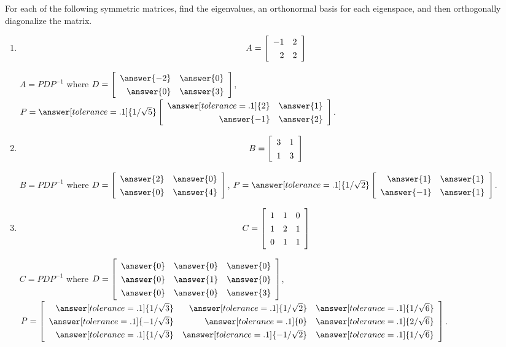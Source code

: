 \documentclass{ximera}
\begin{document}
\begin{problem}
  For each of the following symmetric matrices, find the eigenvalues,
  an orthonormal basis for each eigenspace, and then orthogonally
  diagonalize the matrix.
  \begin{enumerate}
    \item $$A = \startmat{rr}
      -1 & 2 \\
      2  & 2 \\
    \stopmat$$

    $A=PDP^{-1}$ where $D=\startmat{rr}
        \answer{-2} & \answer{0} \\
        \answer{0}  & \answer{3} \\
      \stopmat$,
      $P=\answer[tolerance=.1]{1/\sqrt{5}}\startmat{rr}
        \answer[tolerance=.1]{2}  & \answer{1} \\
        \answer{-1} & \answer{2} \\
      \stopmat$.



    \item $$B = \startmat{rr}
      3 & 1 \\
      1 & 3 \\
    \stopmat$$

      $B=PDP^{-1}$ where $D=\startmat{rr}
      \answer{2} & \answer{0} \\
      \answer{0} & \answer{4} \\
    \stopmat$,
    $P=\answer[tolerance=.1]{1/\sqrt{2}}\startmat{rr}
      \answer{1}  & \answer{1} \\
      \answer{-1} & \answer{1} \\
    \stopmat$.


    
    \item $$C= \startmat{rrr}
      1 & 1 & 0 \\
      1 & 2 & 1 \\
      0 & 1 & 1 \\
    \stopmat$$

    $C=PDP^{-1}$ where
      $D=\startmat{rrr}
        \answer{0} & \answer{0} & \answer{0} \\
        \answer{0} & \answer{1} & \answer{0} \\
        \answer{0} & \answer{0} & \answer{3} \\
      \stopmat$,
      $\def\arraystretch{1.3}
      P=\startmat{rrr}
        \answer[tolerance=.1]{1/\sqrt{3}} & \answer[tolerance=.1]{1/\sqrt{2}} & \answer[tolerance=.1]{1/\sqrt{6}} \\
        \answer[tolerance=.1]{-1/\sqrt{3}} & \answer[tolerance=.1]{0} & \answer[tolerance=.1]{2/\sqrt{6}} \\
        \answer[tolerance=.1]{1/\sqrt{3}} & \answer[tolerance=.1]{-1/\sqrt{2}} & \answer[tolerance=.1]{1/\sqrt{6}} \\
      \stopmat$.



\end{enumerate}
\end{problem}
\end{document}
